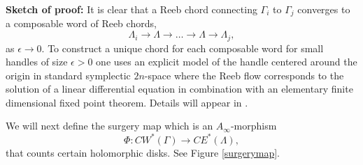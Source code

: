 \documentclass{gtpart}
\begin{document}
{\bf Sketch of proof:}  It is clear that a Reeb chord connecting $\Gamma_i$ to $\Gamma_j$ converges to a composable word of Reeb chords,
\[ 
\Lambda_{i}\to\Lambda\to\dots\to\Lambda\to\Lambda_{j},
\]
as $\epsilon\to 0$. To construct a unique chord for each composable word for small handles of size $\epsilon>0$ one uses an explicit model of the handle centered around the origin in standard symplectic $2n$-space where the Reeb flow corresponds to the solution of a linear differential equation in combination with an elementary finite dimensional fixed point theorem. Details will appear in \cite{BEEfuture}.


We will next define the surgery map which is an $A_{\infty}$-morphism
\[ 
\Phi\colon CW^{\ast}(\Gamma)\to CE^{\ast}(\Lambda),
\]
that counts certain holomorphic disks. See Figure \ref{surgerymap}.
\end{document}
